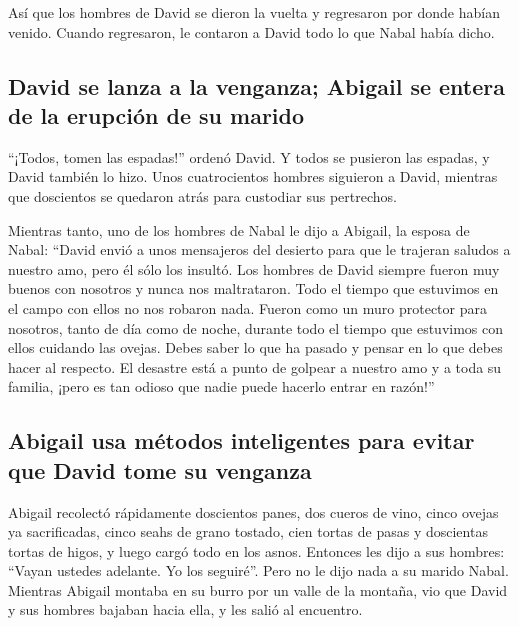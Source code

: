  Así que los hombres de David se dieron la vuelta y
regresaron por donde habían venido. Cuando regresaron, le contaron a
David todo lo que Nabal había dicho.

\hypertarget{david-se-lanza-a-la-venganza-abigail-se-entera-de-la-erupciuxf3n-de-su-marido}{%
\subsection{David se lanza a la venganza; Abigail se entera de la
erupción de su
marido}\label{david-se-lanza-a-la-venganza-abigail-se-entera-de-la-erupciuxf3n-de-su-marido}}

 ``¡Todos, tomen las espadas!'' ordenó David. Y todos se
pusieron las espadas, y David también lo hizo. Unos cuatrocientos
hombres siguieron a David, mientras que doscientos se quedaron atrás
para custodiar sus pertrechos.

 Mientras tanto, uno de los hombres de Nabal le dijo a
Abigail, la esposa de Nabal: ``David envió a unos mensajeros del
desierto para que le trajeran saludos a nuestro amo, pero él sólo los
insultó.  Los hombres de David siempre fueron muy buenos
con nosotros y nunca nos maltrataron. Todo el tiempo que estuvimos en el
campo con ellos no nos robaron nada.  Fueron como un muro
protector para nosotros, tanto de día como de noche, durante todo el
tiempo que estuvimos con ellos cuidando las ovejas. 
Debes saber lo que ha pasado y pensar en lo que debes hacer al respecto.
El desastre está a punto de golpear a nuestro amo y a toda su familia,
¡pero es tan odioso que nadie puede hacerlo entrar en razón!''

\hypertarget{abigail-usa-muxe9todos-inteligentes-para-evitar-que-david-tome-su-venganza}{%
\subsection{Abigail usa métodos inteligentes para evitar que David tome
su
venganza}\label{abigail-usa-muxe9todos-inteligentes-para-evitar-que-david-tome-su-venganza}}

 Abigail recolectó rápidamente doscientos panes, dos
cueros de vino, cinco ovejas ya sacrificadas, cinco seahs de grano
tostado, cien tortas de pasas y doscientas tortas de higos, y luego
cargó todo en los asnos.  Entonces les dijo a sus
hombres: ``Vayan ustedes adelante. Yo los seguiré''. Pero no le dijo
nada a su marido Nabal.  Mientras Abigail montaba en su
burro por un valle de la montaña, vio que David y sus hombres bajaban
hacia ella, y les salió al encuentro.


